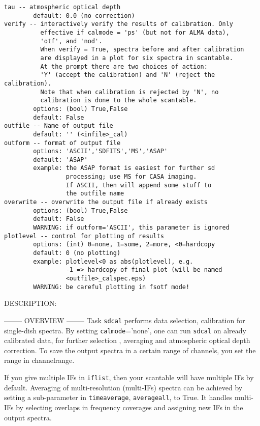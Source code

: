 \begin{verbatim}
tau -- atmospheric optical depth
        default: 0.0 (no correction)
verify -- interactively verify the results of calibration. Only
          effective if calmode = 'ps' (but not for ALMA data),
          'otf', and 'nod'.
          When verify = True, spectra before and after calibration
          are displayed in a plot for six spectra in scantable.
          At the prompt there are two choices of action:
          'Y' (accept the calibration) and 'N' (reject the calibration).
          Note that when calibration is rejected by 'N', no
          calibration is done to the whole scantable.
        options: (bool) True,False
        default: False
outfile -- Name of output file
        default: '' (<infile>_cal)
outform -- format of output file
        options: 'ASCII','SDFITS','MS','ASAP'
        default: 'ASAP'
        example: the ASAP format is easiest for further sd
                 processing; use MS for CASA imaging.
                 If ASCII, then will append some stuff to
                 the outfile name
overwrite -- overwrite the output file if already exists
        options: (bool) True,False
        default: False
        WARNING: if outform='ASCII', this parameter is ignored
plotlevel -- control for plotting of results
        options: (int) 0=none, 1=some, 2=more, <0=hardcopy
        default: 0 (no plotting)
        example: plotlevel<0 as abs(plotlevel), e.g.
                 -1 => hardcopy of final plot (will be named
                 <outfile>_calspec.eps)
        WARNING: be careful plotting in fsotf mode!
\end{verbatim}

DESCRIPTION:

--------
OVERVIEW
--------
Task {\tt sdcal} performs data selection, calibration for single-dish
spectra.  By setting {\tt calmode}='none', one can run {\tt sdcal} on already 
calibrated data, for further selection , averaging and atmospheric 
optical depth correction. To save the output spectra in a certain
range of channels, you set the range in channelrange.

If you give multiple IFs in {\tt iflist}, then your scantable will have
multiple IFs by default. Averaging of multi-resolution (multi-IFs)
spectra can be achieved by setting a sub-parameter in {\tt timeaverage}, 
{\tt averageall}, to True. It handles multi-IFs by selecting overlaps in 
frequency coverages and assigning new IFs in the output spectra.

